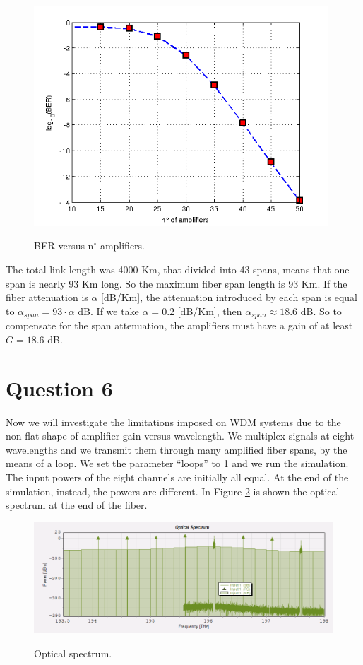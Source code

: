 \documentclass[a4paper,10pt]{report}
\begin{document}
\begin{figure}[!ht]
   \centering
   \includegraphics[width=11cm]{4amplifiers.png}\\
   \caption{BER versus n$^\circ$ amplifiers.}
   \label{4amplifiers}
\end{figure}

The total link length was 4000 Km, that divided into 43 spans, means that one span is nearly 93 Km long.
So the maximum fiber span length is 93 Km. If the fiber attenuation is $\alpha$ [dB/Km], the attenuation introduced by each span
is equal to $\alpha_{span}=93 \cdot \alpha$ dB. If we take $\alpha= 0.2$ [dB/Km], then $\alpha_{span} \approx 18.6$ dB.
So to compensate for the span attenuation, the amplifiers must have a gain of at least $G=18.6$ dB.

\section*{Question 6}
Now we will investigate the limitations imposed on WDM systems due to the non-flat shape of amplifier gain versus wavelength.
We multiplex signals at eight wavelengths and we transmit them through many amplified fiber spans, by the means of a loop.
We set the parameter ``loops'' to 1 and we run the simulation. The input powers of the eight channels are initially all equal.
At the end of the simulation, instead, the powers are different. In Figure \ref{es6} is shown the optical spectrum at the end
of the fiber.

\begin{figure}[!ht]
   \centering
   \includegraphics[width=12cm]{es6.png}\\
   \caption{Optical spectrum.}
   \label{es6}
\end{figure}
\end{document}

